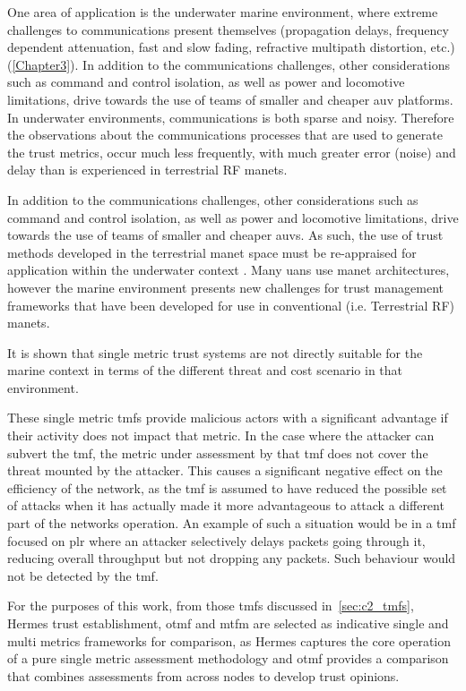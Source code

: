 One area of application is the underwater marine environment, where extreme challenges to communications present themselves (propagation delays, frequency dependent attenuation, fast and slow fading, refractive multipath distortion, etc.)(\autoref{Chapter3}).
In addition to the communications challenges, other considerations such as command and control isolation, as well as power and locomotive limitations, drive towards the use of teams of smaller and cheaper \gls{auv} platforms.
In underwater environments, communications is both sparse and noisy.
Therefore the observations about the communications processes that are used to generate the trust metrics, occur much less frequently, with much greater error (noise) and delay than is experienced in terrestrial RF \glspl{manet}.

In addition to the communications challenges, other considerations such as command and control isolation, as well as power and locomotive limitations, drive towards the use of teams of smaller and cheaper \glspl{auv}.
As such, the use of trust methods developed in the terrestrial \gls{manet} space must be re-appraised for application within the underwater context \cite{Pavan2015}.
Many \glspl{uan} use \gls{manet} architectures, however the marine environment presents new challenges for trust management frameworks that have been developed for use in conventional (i.e. Terrestrial RF) \glspl{manet}.

It is shown that single metric trust systems are not directly suitable for the marine context in terms of the different threat and cost scenario in that environment.

These single metric \glspl{tmf} provide malicious actors with a significant advantage if their activity does not impact that metric.
In the case where the attacker can subvert the \gls{tmf}, the metric under assessment by that \gls{tmf} does not cover the threat mounted by the attacker.
This causes a significant negative effect on the efficiency of the network, as the \gls{tmf} is assumed to have reduced the possible set of attacks when it has actually made it more advantageous to attack a different part of the networks operation.
An example of such a situation would be in a \gls{tmf} focused on \gls{plr} where an attacker selectively delays packets going through it, reducing overall throughput but not dropping any packets.
Such behaviour would not be detected by the \gls{tmf}.

For the purposes of this work, from those \glspl{tmf} discussed in~\autoref{sec:c2_tmfs}, Hermes trust establishment, \gls{otmf} and \gls{mtfm} are selected as indicative single and multi metrics frameworks for comparison, as Hermes captures the core operation of a pure single metric assessment methodology and \gls{otmf} provides a comparison that combines assessments from across nodes to develop trust opinions.

